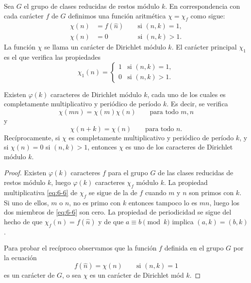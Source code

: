 \documentclass[12pt,a4paper]{book}
\begin{document}
    \begin{definicion}\label{sim:chi}
        Sea $G$ el grupo de clases reducidas de restos módulo $k$. En correspondencia con
        cada carácter $f$ de $G$ definimos una función aritmética $\chi=\chi_{f}$ como
        sigue:
        \begin{align*}
            \chi(n)&=f(\hat{n})\qquad\text{si }(n,k)=1,\\
            \chi(n)&=0\qquad\qquad\ \,\text{si }(n,k)>1.
        \end{align*}
        La función $\chi$ se llama un carácter de Dirichlet módulo $k$. El carácter
        principal $\chi_{1}$ es el que verifica las propiedades
        \begin{equation*}
            \chi_{1}(n)=
            \begin{cases}
                1&\text{si }(n,k)=1,\\
                0&\text{si }(n,k)>1.
            \end{cases}
        \end{equation*}
    \end{definicion}

    \begin{teorema}
        Existen $\varphi(k)$ caracteres de Dirichlet módulo $k$, cada uno de los cuales es
        completamente multiplicativo y periódico de período $k$. Es decir, se verifica
        \begin{equation}\label{eq:6-6}
            \chi(mn)=\chi(m)\chi(n)\qquad\text{para todo }m,n
        \end{equation}
        y
        \begin{equation*}
            \chi(n+k)=\chi(n)\qquad\text{para todo }n.
        \end{equation*}
        Recíprocamente, si $\chi$ es completamente multiplicativo y periódico de período
        $k$, y si $\chi(n)=0$ si $(n,k)>1$, entonces $\chi$ es uno de los caracteres de
        Dirichlet módulo $k$.
    \end{teorema}

    \begin{proof}
        Existen $\varphi(k)$ caracteres $f$ para el grupo $G$ de las clases reducidas de
        restos módulo $k$, luego $\varphi(k)$ caracteres $\chi_{f}$ módulo $k$. La propiedad
        multiplicativa \eqref{eq:6-6} de $\chi_{f}$ se sigue de la de $f$ cuando $m$ y $n$
        son primos con $k$. Si uno de ellos, $m$ o $n$, no es primo con $k$ entonces
        tampoco lo es $mn$, luego los dos miembros de \eqref{eq:6-6} son cero. La
        propiedad de periodicidad se sigue del hecho de que $\chi_{f}(n)=f(\hat{n})$ y de que
        $a\equiv b\pmod{k}$ implica $(a,k)=(b,k)$.

        Para probar el recíproco observamos que la función $f$ definida en el grupo $G$
        por la ecuación
        \begin{equation*}
            f(\hat{n})=\chi(n)\qquad\text{si }(n,k)=1
        \end{equation*}
        es un carácter de $G$, o sea $\chi$ es un carácter de Dirichlet mód $k$.
    \end{proof}
\end{document}
